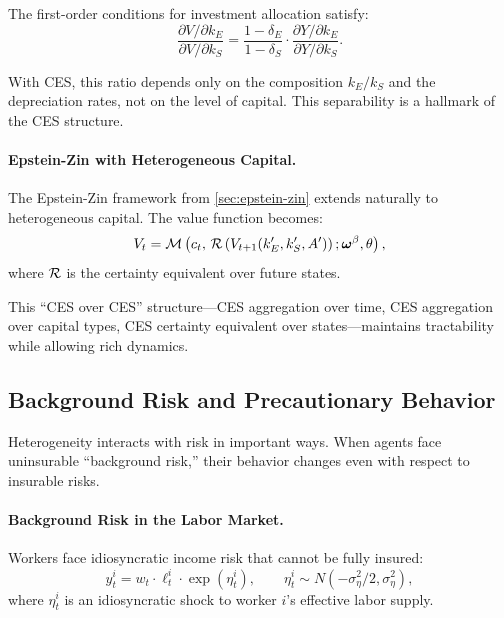 The first-order conditions for investment allocation satisfy:
\begin{equation}
\frac{\partial V / \partial k_E}{\partial V / \partial k_S} = \frac{1 - \delta_E}{1 - \delta_S} \cdot \frac{\partial Y / \partial k_E}{\partial Y / \partial k_S}.
\label{eq:investment-foc}
\end{equation}

With CES, this ratio depends only on the composition $k_E/k_S$ and the depreciation rates, not on the level of capital. This separability is a hallmark of the CES structure.

\paragraph{Epstein-Zin with Heterogeneous Capital.}
The Epstein-Zin framework from \cref{sec:epstein-zin} extends naturally to heterogeneous capital. The value function becomes:
\begin{equation}
V_t = \mathcal{M}\left( c_t, \, \mathcal{R}\left( V_{t+1}(k_E', k_S', A') \right); \boldsymbol{\omega}^\beta, \theta \right),
\label{eq:ez-hetero}
\end{equation}
where $\mathcal{R}$ is the certainty equivalent over future states.

This ``CES over CES'' structure---CES aggregation over time, CES aggregation over capital types, CES certainty equivalent over states---maintains tractability while allowing rich dynamics.

\subsection{Background Risk and Precautionary Behavior}
\label{subsec:background-risk}

Heterogeneity interacts with risk in important ways. When agents face uninsurable ``background risk,'' their behavior changes even with respect to insurable risks.

\paragraph{Background Risk in the Labor Market.}
Workers face idiosyncratic income risk that cannot be fully insured:
\begin{equation}
y_t^i = w_t \cdot \ell_t^i \cdot \exp(\eta_t^i), \qquad \eta_t^i \sim N(-\sigma_\eta^2/2, \sigma_\eta^2),
\label{eq:idiosyncratic-income}
\end{equation}
where $\eta_t^i$ is an idiosyncratic shock to worker $i$'s effective labor supply.


